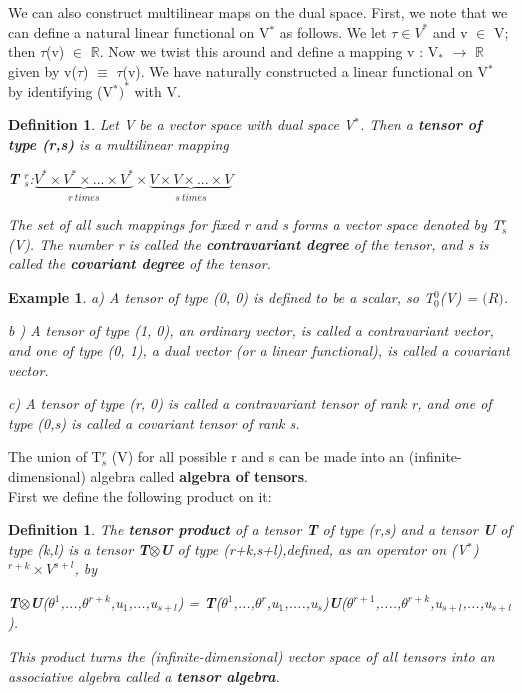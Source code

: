 \documentclass[12pt,a4paper]{article}
\newtheorem{defn}[thm]{Definition}
\newtheorem{exmp}{Example}[section]
\begin{document}
We can also construct multilinear maps on the dual space. First, we note
that we can define a natural linear functional on V$^*$ as follows. We let $\tau \in V^* $
and v $\in$ V; then $\tau$(v) $\in$ $\mathbb{R}$. Now we twist this around and define a mapping
v : V$_*$ $\to$ $\mathbb{R}$ given by v($\tau$) $\equiv$ $\tau$(v). We have naturally constructed a linear functional on V$^*$ by
identifying (V$^*)^*$ with V.
\begin{defn}
Let V be a vector space with dual space V$^*$. Then a \textbf{tensor of type (r,s)} is a multilinear mapping\begin{center}
\textbf{T} $^r_s$:$\underbrace{V^*\times V^*\times ... \times V^*}_{r\ times}\times\underbrace{V\times V\times...\times V}_{s\ times}$
\end{center}
The set of all such mappings for fixed r and s forms a vector space denoted
by T$^r_s$ (V). The number r is called the \textbf{contravariant degree} of the tensor,
and s is called the \textbf{covariant degree} of the tensor.
\end{defn}
\begin{exmp}
\item[a)]A tensor of type (0, 0) is defined to be a scalar, so T$^0_0$(V) = $\mathbb(R)$.
\item[b]) A tensor of type (1, 0), an ordinary vector, is called a contravariant vector, and one
of type (0, 1), a dual vector (or a linear functional), is called a covariant
vector.
\item[c)] A tensor of type (r, 0) is called a contravariant tensor of rank r,
and one of type (0,s) is called a covariant tensor of rank s.
\end{exmp}
The union of T$^r_s$ (V) for all possible r and s can be made into an (infinite-dimensional) algebra called \textbf{algebra of tensors}.\\
First we define the following product on it:
\begin{defn}
The \textbf{tensor product} of a tensor \textbf{T} of type (r,s) and a tensor \textbf{U} of type (k,l) is a tensor \textbf{T}$\otimes$\textbf{U} of type (r+k,s+l),defined, as an operator on (V$^*$)$^{r+k}\times V^{s+l}$, by \begin{center}
\textbf{T}$\otimes$\textbf{U}($\theta^1$,...,$\theta^{r+k}$,u$_1$,...,u$_{s+l}$) = \textbf{T}($\theta^1$,...,$\theta^r$,u$_1$,....,u$_s$)\textbf{U}($\theta^{r+1}$,....,$\theta^{r+k}$,u$_{s+l}$,...,u$_{s+l}$).
\end{center}
This product turns the (infinite-dimensional) vector space of all tensors into an associative algebra called a \textbf{tensor algebra}.
\end{defn}
\end{document}
